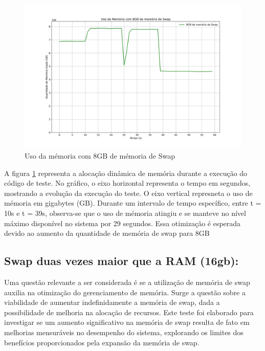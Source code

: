 \documentclass[
	12pt,				%
	openright,			%
	oneside,			%
	a4paper,			%
	chapter=TITLE,		%
	english,			%
	french,				%
	spanish,			%
	brazil				%
	]{abntex2}
\theoremstyle{definition}
\begin{document}
\begin{figure}[H]
	\centering
	\includegraphics[width=1.0\textwidth]{8gb_swap.png}
	\caption{Uso da mémoria com 8GB de mémoria de Swap}
	\label{fig:testes_swap8}
\end{figure}

A figura \ref{fig:testes_swap8} representa a alocação dinâmica de memória durante a execução do código de teste. No gráfico, o eixo
horizontal representa o tempo em segundos, mostrando a evolução da execução do teste. O eixo vertical represneta o uso de mémoria
em gigabytes (GB). Durante um intervalo de tempo específico, entre t = 10s e t = 39s, observa-se que o uso de mémoria atingiu e se
manteve no nível máximo disponível no sistema por 29 segundos. Essa otimização é esperada devido ao aumento da quantidade de 
memória de swap para 8GB

\subsection{Swap duas vezes maior que a RAM (16gb):}
Uma questão relevante a ser considerada é se a utilização de memória de swap auxilia na otimização do gerenciamento de memória. Surge 
a questão sobre a viabilidade de aumentar indefinidamente a memória de swap, dada a possibilidade de melhoria na alocação de 
recursos. Este teste foi elaborado para investigar se um aumento significativo na memória de swap resulta de fato em melhorias 
mensuráveis no desempenho do sistema, explorando os limites dos benefícios proporcionados pela expansão da memória de swap.
\end{document}
